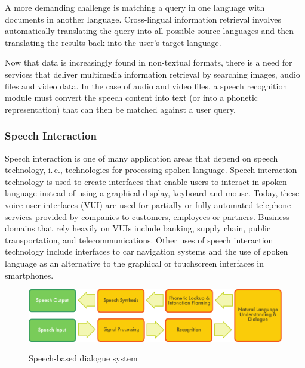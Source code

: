 \begin{multicols}{2}

A more demanding challenge is matching a query in one language with documents in another language. Cross-lingual information retrieval involves automatically translating the query into all possible source languages and then translating the results back into the user's target language.

Now that data is increasingly found in non-textual formats, there is a need for services that deliver multimedia information retrieval by searching images, audio files and video data. In the case of audio and video files, a speech recognition module must convert the speech content into text (or into a phonetic representation) that can then be matched against a user query.

\subsubsection{Speech Interaction}

Speech interaction is one of many application areas that depend on speech technology, i.\,e., technologies for processing spoken language. Speech interaction technology is used to create interfaces that enable users to interact in spoken language instead of using a graphical display, keyboard and mouse.  Today, these voice user interfaces (VUI) are used for partially or fully automated telephone services provided by companies to customers, employees or partners. Business domains that rely heavily on VUIs include banking, supply chain, public transportation, and telecommunications. Other uses of speech interaction technology include interfaces to car navigation systems and the use of spoken language as an alternative to the graphical or touchscreen interfaces in smartphones.

\begin{figure}[htb]
  \center
  \includegraphics[width=\textwidth]{../_media/english/simple_speech-based_dialogue_architecture}
  \caption{Speech-based dialogue system}
   \label{fig:dialoguearch_en}
\end{figure}


\end{multicols}
